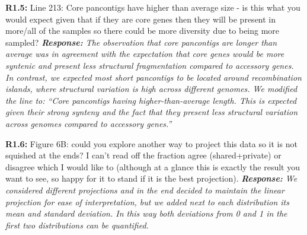 \documentclass[aps,rmp,onecolumn]{revtex4-1}
\newcommand{\Marco}[1]{{\color{gray}Marco: #1}}
\newcommand{\Liam}[1]{{\color{teal}Liam: #1}}
\newcommand{\reviewer}[2]{\textbf{#1:} #2\vskip 5mm}
\newcommand{\response}[1]{{\it {\color{response}\textbf{Response:} #1}}\vskip 5mm}
\begin{document}
\reviewer{R1.5}{Line 213: Core pancontigs have higher than average size - is this what you would expect given that if they are core genes then they will be present in more/all of the samples so there could be more diversity due to being more sampled?}
\response{The observation that core pancontigs are longer than average was in agreement with the expectation that core genes would be more syntenic and present less structural fragmentation compared to accessory genes. In contrast, we expected most short pancontigs to be located around recombination islands, where structural variation is high across different genomes.
      We modified the line to: ``Core pancontigs having higher-than-average length. This is expected given their strong synteny and the fact that they present less structural variation across genomes compared to accessory genes.''}

\reviewer{R1.6}{Figure 6B: could you explore another way to project this data so it is not squished at the ends? I can't read off the fraction agree (shared+private) or disagree which I would like to (although at a glance this is exactly the result you want to see, so happy for it to stand if it is the best projection).}
\response{We considered different projections and in the end decided to maintain the linear projection for ease of interpretation, but we added next to each distribution its mean and standard deviation. In this way both deviations from 0 and 1 in the first two distributions can be quantified.}
\end{document}
